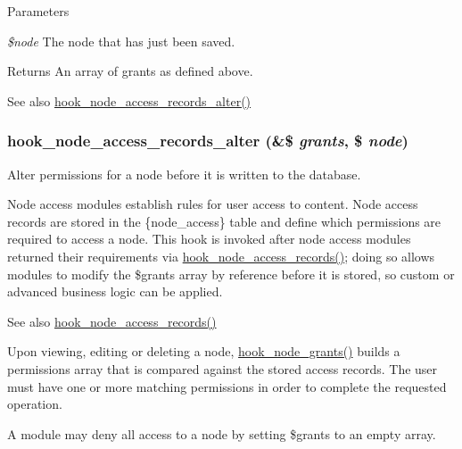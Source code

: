 \begin{DoxyParams}{Parameters}
\item[{\em \$node}]The node that has just been saved.\end{DoxyParams}
\begin{DoxyReturn}{Returns}
An array of grants as defined above.
\end{DoxyReturn}
\begin{DoxySeeAlso}{See also}
\hyperlink{group__node__access_ga37c90bf0e1dccad0deefa368dd94cc83}{hook\_\-node\_\-access\_\-records\_\-alter()} 
\end{DoxySeeAlso}
\hypertarget{group__node__access_ga37c90bf0e1dccad0deefa368dd94cc83}{
\subsubsection[{hook\_\-node\_\-access\_\-records\_\-alter}]{\setlength{\rightskip}{0pt plus 5cm}hook\_\-node\_\-access\_\-records\_\-alter (\&\$ {\em grants}, \/  \$ {\em node})}}
\label{group__node__access_ga37c90bf0e1dccad0deefa368dd94cc83}
Alter permissions for a node before it is written to the database.

Node access modules establish rules for user access to content. Node access records are stored in the \{node\_\-access\} table and define which permissions are required to access a node. This hook is invoked after node access modules returned their requirements via \hyperlink{group__node__access_ga3fe7744d74446e40e9b9ad2a782b4269}{hook\_\-node\_\-access\_\-records()}; doing so allows modules to modify the \$grants array by reference before it is stored, so custom or advanced business logic can be applied.

\begin{DoxySeeAlso}{See also}
\hyperlink{group__node__access_ga3fe7744d74446e40e9b9ad2a782b4269}{hook\_\-node\_\-access\_\-records()}
\end{DoxySeeAlso}
Upon viewing, editing or deleting a node, \hyperlink{group__node__access_gaa973f2ab6ab14c3fa14e5138c6d69ecf}{hook\_\-node\_\-grants()} builds a permissions array that is compared against the stored access records. The user must have one or more matching permissions in order to complete the requested operation.

A module may deny all access to a node by setting \$grants to an empty array.

